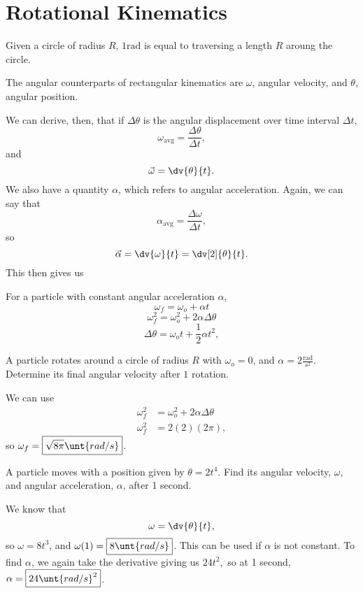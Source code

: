 \documentclass[11pt]{article}
\begin{document}
\section{Rotational Kinematics}
Given a circle of radius $R$, $1 \text{rad}$ is equal to traversing a length $R$ aroung the circle.
\begin{defn}
	The angular counterparts of rectangular kinematics are $\omega$, angular velocity, and $\theta$, angular position.
\end{defn}
We can derive, then, that if $\Delta \theta$ is the angular displacement over time interval $\Delta t$,
\[\omega_{\text{avg}} = \frac{\Delta \theta}{\Delta t},\]
and
\[\vec{\omega} = \dv{\theta}{t}.\]
We also have a quantity $\alpha$, which refers to angular acceleration. Again, we can say that
\[\alpha_{\text{avg}} = \frac{\Delta \omega}{\Delta t},\]
so
\[\vec{\alpha} = \dv{\omega}{t} = \dv[2]{\theta}{t}.\]
This then gives us
\begin{eqn}
	For a particle with constant angular acceleration $\alpha$,
	\[\omega_f = \omega_o + \alpha t\]
	\[\omega_f^2 = \omega_o^2 +2\alpha \Delta\theta\]
	\[\Delta \theta = \omega_ot + \frac{1}{2}\alpha t^2,\]
\end{eqn}
\begin{example}
	A particle rotates around a circle of radius $R$ with $\omega_o = 0$, and $\alpha = 2 \frac{\text{rad}}{s^2}$. Determine its final angular velocity after $1$ rotation.
\end{example}
\begin{solution}
	We can use
	\begin{align*}
		\omega_f^2 &= \omega_o^2 + 2\alpha\Delta\theta \\
		\omega_f^2 &= 2(2)(2\pi),
	\end{align*}
	so $\omega_f = \boxed{\sqrt{8\pi} \unt{rad/s}}$.
\end{solution}

\begin{example}
	A particle moves with a position given by $\theta = 2t^4$. Find its angular velocity, $\omega$, and angular acceleration, $\alpha$, after 1 second.
\end{example}
\begin{solution}
We know that
\[\omega = \dv{\theta}{t},\]
so $\omega = 8t^3$, and $\omega(1) = \boxed{8\unt{rad/s}}$. This can be used if $\alpha$ is not constant. To find $\alpha$, we again take the derivative giving us $24t^2,$ so at 1 second, $\alpha = \boxed{24\unt{rad/s}^2}$.
\end{solution}
\end{document}
